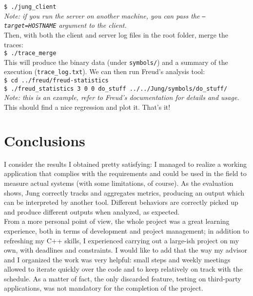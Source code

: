         \texttt{\$ ./jung\_client}\\

        \textit{Note: if you run the server on another machine, you can pass the \texttt{---target=HOSTNAME}
        argument to the client.}\\

        Then, with both the client and server log files in the root folder, merge the traces:\\

        \texttt{\$ ./trace\_merge}\\

        This will produce the binary data (under \texttt{symbols/}) and a summary of the execution
        (\texttt{trace\_log.txt}).
        We can then run Freud's analysis tool:\\

        \texttt{\$ cd ../freud/freud-statistics}\\

        \texttt{\$ ./freud\_statistics 3 0 0 do\_stuff ../../Jung/symbols/do\_stuff/}\\
        
        \textit{Note: this is an example, refer to Freud's documentation for details and usage.}\\

        This should find a nice regression and plot it. That's it!


\chapter{Conclusions}


    I consider the results I obtained pretty satisfying: I managed to realize a working application
    that complies with the requirements and could be used in the field to measure actual systems
    (with some limitations, of course). As the evaluation shows, Jung correctly tracks and aggregates
    metrics, producing an output which can be interpreted by another tool. Different behaviors are
    correctly picked up and produce different outputs when analyzed, as expected.\\
    
    From a more personal point of view, the whole project was a great learning experience, both
    in terms of development and project management; in addition to refreshing my C++ skills, I
    experienced carrying out a large-ish project on my own, with deadlines and constraints.
    I would like to add that the way my advisor and I organized the work was very helpful: small
    steps and weekly meetings allowed to iterate quickly over the code and to keep 
    relatively on track with the schedule. As a matter of fact, the only discarded feature,
    testing on third-party applications, was not mandatory for the completion of the project.\\

